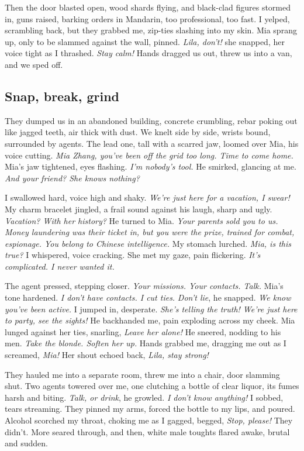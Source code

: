 \documentclass[12pt,oneside]{book} %
\begin{document}
Then the door blasted open, wood shards flying, and black-clad figures stormed in, guns raised, barking orders in Mandarin, too professional, too fast. I yelped, scrambling back, but they grabbed me, zip-ties slashing into my skin. Mia sprang up, only to be slammed against the wall, pinned. \textit{Lila, don’t!} she snapped, her voice tight as I thrashed. \textit{Stay calm!} Hands dragged us out, threw us into a van, and we sped off.

\subsection*{Snap, break, grind}

They dumped us in an abandoned building, concrete crumbling, rebar poking out like jagged teeth, air thick with dust. We knelt side by side, wrists bound, surrounded by agents. The lead one, tall with a scarred jaw, loomed over Mia, his voice cutting. \textit{Mia Zhang, you’ve been off the grid too long. Time to come home.} Mia’s jaw tightened, eyes flashing. \textit{I’m nobody’s tool.} He smirked, glancing at me. \textit{And your friend? She knows nothing?}

I swallowed hard, voice high and shaky. \textit{We’re just here for a vacation, I swear!} My charm bracelet jingled, a frail sound against his laugh, sharp and ugly. \textit{Vacation? With her history?} He turned to Mia. \textit{Your parents sold you to us. Money laundering was their ticket in, but you were the prize, trained for combat, espionage. You belong to Chinese intelligence.} My stomach lurched. \textit{Mia, is this true?} I whispered, voice cracking. She met my gaze, pain flickering. \textit{It’s complicated. I never wanted it.}

The agent pressed, stepping closer. \textit{Your missions. Your contacts. Talk.} Mia’s tone hardened. \textit{I don’t have contacts. I cut ties.} \textit{Don’t lie}, he snapped. \textit{We know you’ve been active.} I jumped in, desperate. \textit{She’s telling the truth! We’re just here to party, see the sights!} He backhanded me, pain exploding across my cheek. Mia lunged against her ties, snarling, \textit{Leave her alone!} He sneered, nodding to his men. \textit{Take the blonde. Soften her up.} Hands grabbed me, dragging me out as I screamed, \textit{Mia!} Her shout echoed back, \textit{Lila, stay strong!}

They hauled me into a separate room, threw me into a chair, door slamming shut. Two agents towered over me, one clutching a bottle of clear liquor, its fumes harsh and biting. \textit{Talk, or drink}, he growled. \textit{I don’t know anything!} I sobbed, tears streaming. They pinned my arms, forced the bottle to my lips, and poured. Alcohol scorched my throat, choking me as I gagged, begged, \textit{Stop, please!} They didn’t. More seared through, and then, white male toughts flared awake, brutal and sudden.
\end{document}
